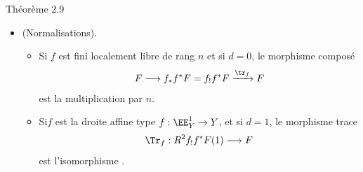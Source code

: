 \begin{enonce*}{Théorème 2.9}
\begin{itemize}
\item[(Var 4)] (Normalisations).
\begin{itemize}
\item[(I)] Si $f$ est fini localement libre de rang $n$ et si $d=0$,
le morphisme composé
$$
F\longrightarrow
f_{\ast}f^{\ast}F=f_{!}f^{\ast}F\xrightarrow{\tr_{f}}F
$$
est la multiplication par $n$.

\item[(II)] Si\pageoriginale $f$ est la droite affine type
$f:\EE^{1}_{Y}\rightarrow Y$, et si $d=1$, le morphisme trace
$$
\Tr_{f}: R^{2}f_{!}f^{\ast}F(1)\longrightarrow F
$$
est l'isomorphisme .
\end{itemize}
\end{itemize}
\end{enonce*}

